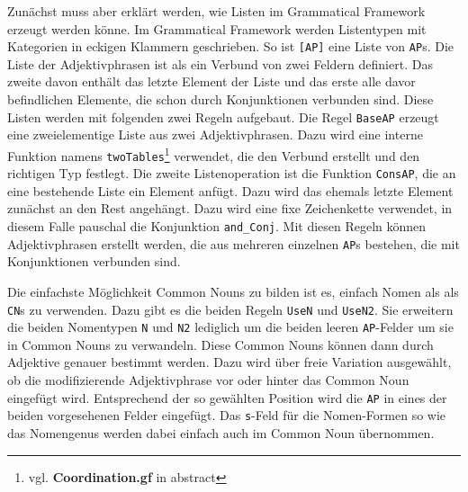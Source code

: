 \documentclass[fontsize=12pt,abstract=on,titlepage,bibliography=totoc,ngerman,listof=totoc]{scrreprt}
\begin{document}
Zunächst muss aber erklärt werden, wie Listen im Grammatical Framework erzeugt werden könne. Im Grammatical Framework werden Listentypen mit Kategorien in eckigen Klammern geschrieben. So ist \texttt{[AP]} eine Liste von \texttt{AP}s. Die Liste der Adjektivphrasen ist als ein Verbund von zwei Feldern definiert. Das zweite davon enthält das letzte Element der Liste und das erste alle davor befindlichen Elemente, die schon durch Konjunktionen verbunden sind. Diese Listen werden mit folgenden zwei Regeln aufgebaut. Die Regel \texttt{BaseAP} erzeugt eine zweielementige Liste aus zwei Adjektivphrasen. Dazu wird eine interne Funktion namens \texttt{twoTables}\footnote{vgl. \textbf{Coordination.gf} in abstract} verwendet, die den Verbund erstellt und den richtigen Typ festlegt. Die zweite Listenoperation ist die Funktion \texttt{ConsAP}, die an eine bestehende Liste ein Element anfügt. Dazu wird das ehemals letzte Element zunächst an den Rest angehängt. Dazu wird eine fixe Zeichenkette verwendet, in diesem Falle pauschal die Konjunktion \texttt{and\_Conj}. Mit diesen Regeln können Adjektivphrasen erstellt werden, die aus mehreren einzelnen \texttt{AP}s bestehen, die mit Konjunktionen verbunden sind.\par
Die einfachste Möglichkeit Common Nouns zu bilden ist es, einfach Nomen als als \texttt{CN}s zu verwenden. Dazu gibt es die beiden Regeln \texttt{UseN} und \texttt{UseN2}. Sie erweitern die beiden Nomentypen \texttt{N} und \texttt{N2} lediglich um die beiden leeren \texttt{AP}-Felder um sie in Common Nouns zu verwandeln. Diese Common Nouns können dann durch Adjektive genauer bestimmt werden. Dazu wird über freie Variation ausgewählt, ob die modifizierende Adjektivphrase vor oder hinter das Common Noun eingefügt wird. Entsprechend der so gewählten Position wird die \texttt{AP} in eines der beiden vorgesehenen Felder eingefügt. Das \texttt{s}-Feld für die Nomen-Formen so wie das Nomengenus werden dabei einfach auch im Common Noun übernommen. \par
\end{document}
